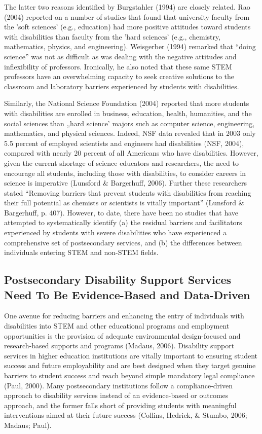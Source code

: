 \documentclass[11.5pt]{sig-alternate} %
\begin{document}
\begin{large}
The latter two reasons identified by Burgstahler (1994) are closely related. Rao (2004) reported on a number of studies that found that university faculty from the 'soft sciences' (e.g., education) had more positive attitudes toward students with disabilities than faculty from the 'hard sciences' (e.g., chemistry, mathematics, physics, and engineering). Weisgerber (1994) remarked that “doing science” was not as difficult as was dealing with the negative attitudes and inflexibility of professors. Ironically, he also noted that these same STEM professors have an overwhelming capacity to seek creative solutions to the classroom and laboratory barriers experienced by students with disabilities.

Similarly, the National Science Foundation (2004) reported that more students with disabilities are enrolled in business, education, health, humanities, and the social sciences than „hard science' majors such as computer science, engineering, mathematics, and physical sciences. Indeed, NSF data revealed that in 2003 only 5.5 percent of employed scientists and engineers had disabilities (NSF, 2004), compared with nearly 20 percent of all Americans who have disabilities. However, given the current shortage of science educators and researchers, the need to encourage all students, including those with disabilities, to consider careers in science is imperative (Lunsford \& Bargerhuff, 2006). Further these researchers stated “Removing barriers that prevent students with disabilities from reaching their full potential as chemists or scientists is vitally important” (Lunsford \& Bargerhuff, p. 407). However, to date, there have been no studies that have attempted to systematically identify (a) the residual barriers and facilitators experienced by students with severe disabilities who have experienced a comprehensive set of postsecondary services, and (b) the differences between individuals entering STEM and non-STEM fields.

\subsection*{Postsecondary Disability Support Services Need To Be Evidence-Based and Data-Driven}
One avenue for reducing barriers and enhancing the entry of individuals with disabilities into STEM and other educational programs and employment opportunities is the provision of adequate environmental design-focused and research-based supports and programs (Madaus, 2006). Disability support services in higher education institutions are vitally important to ensuring student success and future employability and are best designed when they target genuine barriers to student success and reach beyond simple mandatory legal compliance (Paul, 2000). Many postsecondary institutions follow a compliance-driven approach to disability services instead of an evidence-based or outcomes approach, and the former falls short of providing students with meaningful interventions aimed at their future success (Collins, Hedrick, \& Stumbo, 2006; Madaus; Paul).


\end{large}
\end{document}
